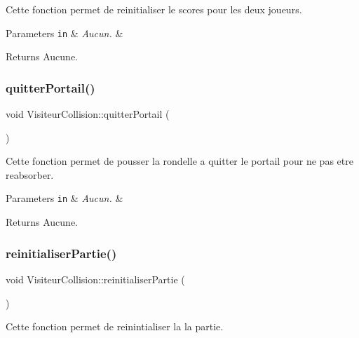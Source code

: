 Cette fonction permet de reinitialiser le scores pour les deux joueurs.


\begin{DoxyParams}[1]{Parameters}
\mbox{\tt in}  & {\em Aucun.} & \\
\hline
\end{DoxyParams}
\begin{DoxyReturn}{Returns}
Aucune. 
\end{DoxyReturn}
\hypertarget{class_visiteur_collision_a9c727900f93230caf0bb10740a8ebd90}{}\label{class_visiteur_collision_a9c727900f93230caf0bb10740a8ebd90} 
\subsubsection{\texorpdfstring{quitter\+Portail()}{quitterPortail()}}
{\footnotesize\ttfamily void Visiteur\+Collision\+::quitter\+Portail (\begin{DoxyParamCaption}{ }\end{DoxyParamCaption})}

Cette fonction permet de pousser la rondelle a quitter le portail pour ne pas etre reabsorber.


\begin{DoxyParams}[1]{Parameters}
\mbox{\tt in}  & {\em Aucun.} & \\
\hline
\end{DoxyParams}
\begin{DoxyReturn}{Returns}
Aucune. 
\end{DoxyReturn}
\hypertarget{class_visiteur_collision_a1918900085adcd2403fc8832ca04ede0}{}\label{class_visiteur_collision_a1918900085adcd2403fc8832ca04ede0} 
\subsubsection{\texorpdfstring{reinitialiser\+Partie()}{reinitialiserPartie()}}
{\footnotesize\ttfamily void Visiteur\+Collision\+::reinitialiser\+Partie (\begin{DoxyParamCaption}{ }\end{DoxyParamCaption})}

Cette fonction permet de reinintialiser la la partie.



